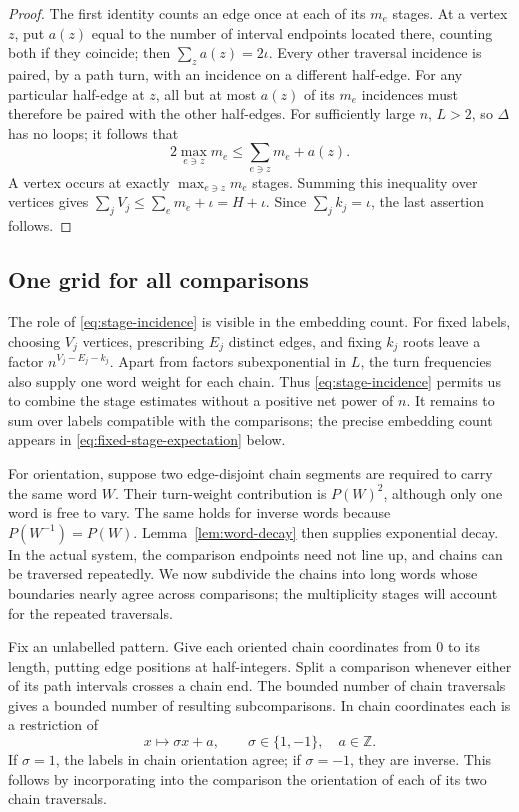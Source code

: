 \begin{proof}
The first identity counts an edge once at each of its $m_e$ stages.
At a vertex $z$, put $a(z)$ equal to the number of interval endpoints
located there, counting both if they coincide; then
$\sum_z a(z)=2\iota$.  Every other traversal incidence is paired,
by a path turn, with an incidence on a different half-edge.
For any particular half-edge at $z$, all but at most $a(z)$ of its
$m_e$ incidences must therefore be paired with the other half-edges.
For sufficiently large $n$, $L>2$, so $\Delta$ has no loops; it follows
that
\[
 2\max_{e\ni z}m_e\leq\sum_{e\ni z}m_e+a(z).
\]
A vertex occurs at exactly $\max_{e\ni z}m_e$ stages.  Summing this
inequality over vertices gives
$\sum_jV_j\leq\sum_e m_e+\iota=H+\iota$.  Since $\sum_jk_j=\iota$,
the last assertion follows.
\end{proof}

\subsection{One grid for all comparisons}

The role of \eqref{eq:stage-incidence} is visible in the embedding count.
For fixed labels, choosing $V_j$ vertices, prescribing $E_j$ distinct
edges, and fixing $k_j$ roots leave a factor $n^{V_j-E_j-k_j}$.
Apart from factors subexponential in $L$, the turn frequencies also
supply one word weight for each chain. Thus
\eqref{eq:stage-incidence} permits us to combine the stage estimates
without a positive net power of $n$. It remains to sum over labels
compatible with the comparisons; the precise embedding count appears
in \eqref{eq:fixed-stage-expectation} below.

For orientation, suppose two edge-disjoint chain segments are required
to carry the same word $W$. Their turn-weight contribution is $P(W)^2$,
although only one word is free to vary. The same holds for inverse
words because $P(W^{-1})=P(W)$. Lemma~\ref{lem:word-decay} then supplies
exponential decay. In the actual system, the comparison endpoints
need not line up, and chains can be traversed repeatedly. We now
subdivide the chains into long words whose boundaries nearly agree
across comparisons; the multiplicity stages will account for the
repeated traversals.

Fix an unlabelled pattern.  Give each oriented chain coordinates from
$0$ to its length, putting edge positions at half-integers.  Split a
comparison whenever either of its path intervals crosses a chain end.
The bounded number of chain traversals gives a bounded number of
resulting subcomparisons.  In chain coordinates each is a restriction
of
\begin{equation}\label{eq:comparison-affine-map}
 x\longmapsto \sigma x+a,\qquad \sigma\in\{1,-1\},\quad a\in\mathbb Z.
\end{equation}
If $\sigma=1$, the labels in chain orientation agree; if $\sigma=-1$,
they are inverse.  This follows by incorporating into the comparison
the orientation of each of its two chain traversals.

